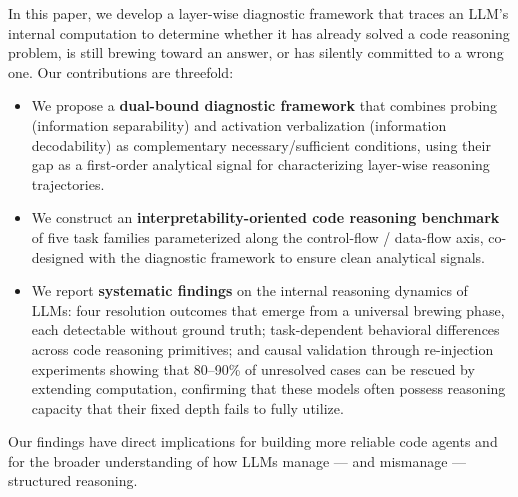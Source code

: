 In this paper, we develop a layer-wise diagnostic framework that traces an LLM's internal computation to determine whether it has already solved a code reasoning problem, is still brewing toward an answer, or has silently committed to a wrong one. Our contributions are threefold:
\begin{itemize}
    \item We propose a \textbf{dual-bound diagnostic framework} that combines probing (information separability) and activation verbalization (information decodability) as complementary necessary/sufficient conditions, using their gap as a first-order analytical signal for characterizing layer-wise reasoning trajectories.
    \item We construct an \textbf{interpretability-oriented code reasoning benchmark} of five task families parameterized along the control-flow / data-flow axis, co-designed with the diagnostic framework to ensure clean analytical signals.
    \item We report \textbf{systematic findings} on the internal reasoning dynamics of LLMs: four resolution outcomes that emerge from a universal brewing phase, each detectable without ground truth; task-dependent behavioral differences across code reasoning primitives; and causal validation through re-injection experiments showing that 80--90\% of unresolved cases can be rescued by extending computation, confirming that these models often possess reasoning capacity that their fixed depth fails to fully utilize.
\end{itemize}
Our findings have direct implications for building more reliable code agents and for the broader understanding of how LLMs manage --- and mismanage --- structured reasoning.
